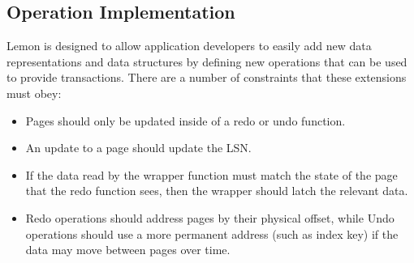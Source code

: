 \documentclass[letterpaper,twocolumn,english]{article}
\newcommand{\yad}{Lemon\xspace}
\begin{document}


%

\subsection{Operation Implementation}


\yad is designed to allow application developers to easily add new
data representations and data structures by defining new operations
that can be used to provide transactions.  There are a number of
constraints that these extensions must obey:

\begin{itemize}
\item Pages should only be updated inside of a redo or undo function.
\item An update to a page should update the LSN. 
\item If the data read by the wrapper function must match the state of
the page that the redo function sees, then the wrapper should latch
the relevant data.
\item Redo operations should address pages by their physical offset,
while Undo operations should use a more permanent address (such as
index key) if the data may move between pages over time.
\end{itemize}
\end{document}
